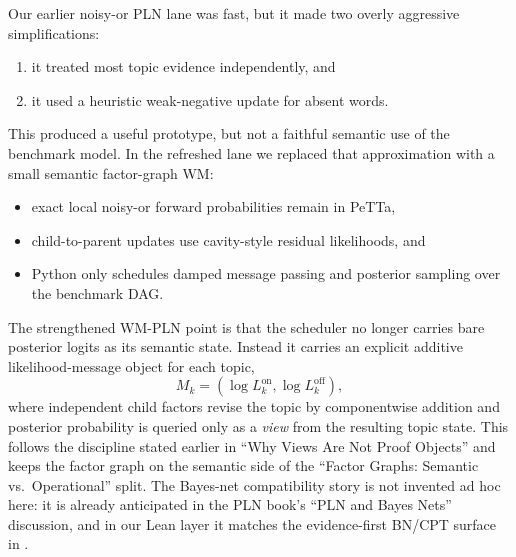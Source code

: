 \documentclass[11pt,openany]{report}
\begin{document}
Our earlier noisy-or PLN lane was fast, but it made two overly aggressive
simplifications:
\begin{enumerate}
\item it treated most topic evidence independently, and
\item it used a heuristic weak-negative update for absent words.
\end{enumerate}
This produced a useful prototype, but not a faithful semantic use of the
benchmark model.  In the refreshed lane we replaced that approximation with a
small semantic factor-graph WM:
\begin{itemize}
\item exact local noisy-or forward probabilities remain in PeTTa,
\item child-to-parent updates use cavity-style residual likelihoods, and
\item Python only schedules damped message passing and posterior sampling over
the benchmark DAG.
\end{itemize}

The strengthened WM-PLN point is that the scheduler no longer carries bare
posterior logits as its semantic state.  Instead it carries an explicit
additive likelihood-message object for each topic,
\[
  M_k = (\log L_k^{\mathrm{on}}, \log L_k^{\mathrm{off}}),
\]
where independent child factors revise the topic by componentwise addition and
posterior probability is queried only as a \emph{view} from the resulting topic
state.  This follows the discipline stated earlier in ``Why Views Are Not
Proof Objects'' and keeps the factor graph on the semantic side of the
``Factor Graphs: Semantic vs.\ Operational'' split.  The Bayes-net
compatibility story is not invented ad hoc here: it is already anticipated in
the PLN book's ``PLN and Bayes Nets'' discussion, and in our Lean layer it
matches the evidence-first BN/CPT surface in
.
\end{document}
